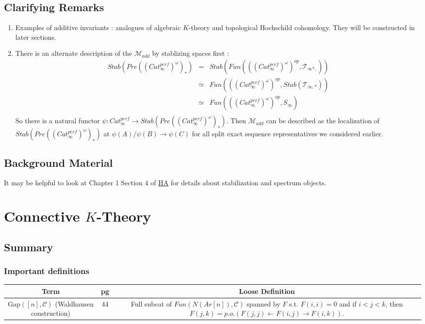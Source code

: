 \documentclass[letterpaper]{article}
\theoremstyle{definition}
\newcommand{\mc}{\mathcal}
\begin{document}
\subsection{Clarifying Remarks}

\begin{enumerate}
\item Examples of additive invariants : analogues of algebraic $K$-theory and topological Hochschild cohomology. They will be constructed in later sections. 
\item There is an alternate description of the $\mathcal{M}_{add}$ by stablizing spaces first :
\begin{eqnarray*}
Stab(Pre((Cat_\infty^{perf})^\omega)_*) & = & Stab(Fun(((Cat_\infty^{perf})^{\omega})^{op}, \mathcal{T}_{\infty*,}))\\
& \simeq & Fun(((Cat_\infty^{perf})^{\omega})^{op}, Stab(\mathcal{T}_{\infty,*}))\\
& \simeq & Fun(((Cat_\infty^{perf})^{\omega})^{op}, S_\infty)\\
\end{eqnarray*}
So there is a natural functor $\psi : Cat_\infty^{perf} \rightarrow Stab(Pre((Cat_\infty^{perf})^\omega)_*)$. Then $\mathcal{M}_{add}$ can be described as the localization of $Stab(Pre((Cat_\infty^{perf})^\omega)_*)$ at $\psi(A)/\psi(B) \rightarrow \psi(C)$ for all split exact sequence representatives we considered earlier. 
\end{enumerate}

\subsection{Background Material}

It may be helpful to look at Chapter 1 Section 4 of \href{References/LurieHigherAlgebra.pdf}{HA} for details about stabilization and spectrum objects. 

\section{Connective $K$-Theory}

\subsection{Summary}

\subsubsection{Important definitions}
\begin{tabulary}{\textwidth}{|C|C|C|}
\hline
Term & pg & Loose Definition\\
\hline
\hline
Gap$([n],\mc C)$ (Waldhausen construction)  & 44 & Full subcat of $Fun(N(Ar[n]),\mc C)$ spanned
                        by $F$ s.t. $F(i,i) = 0$
                        and if $i < j < k$, then $F(j,k) =
                        p.o. (F(j,j) \leftarrow F(i,j) \rightarrow F(i,k))$.\\
\hline


\end{tabulary}
\end{document}
